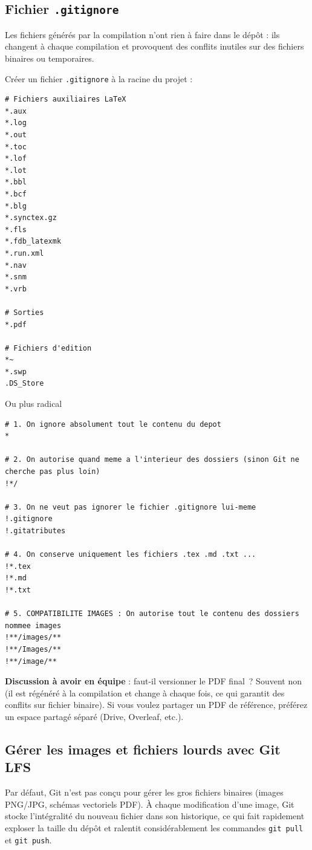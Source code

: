 \documentclass[11pt,a4paper]{article}
\begin{document}
\subsection{Fichier \texttt{.gitignore}}

Les fichiers générés par la compilation n'ont rien à faire dans le dépôt : ils changent à chaque compilation et provoquent des conflits inutiles sur des fichiers binaires ou temporaires.

Créer un fichier \texttt{.gitignore} à la racine du projet :

\begin{lstlisting}[style=plainstyle]
# Fichiers auxiliaires LaTeX
*.aux
*.log
*.out
*.toc
*.lof
*.lot
*.bbl
*.bcf
*.blg
*.synctex.gz
*.fls
*.fdb_latexmk
*.run.xml
*.nav
*.snm
*.vrb

# Sorties
*.pdf

# Fichiers d'edition
*~
*.swp
.DS_Store
\end{lstlisting}

Ou plus radical 
\begin{lstlisting}[style=plainstyle]
# 1. On ignore absolument tout le contenu du depot
*

# 2. On autorise quand meme a l'interieur des dossiers (sinon Git ne cherche pas plus loin)
!*/

# 3. On ne veut pas ignorer le fichier .gitignore lui-meme
!.gitignore
!.gitatributes

# 4. On conserve uniquement les fichiers .tex .md .txt ...
!*.tex
!*.md
!*.txt

# 5. COMPATIBILITE IMAGES : On autorise tout le contenu des dossiers nommee images
!**/images/**
!**/Images/**
!**/image/**
\end{lstlisting}


\textbf{Discussion à avoir en équipe} : faut-il versionner le PDF final~? Souvent non (il est régénéré à la compilation et change à chaque fois, ce qui garantit des conflits sur fichier binaire). Si vous voulez partager un PDF de référence, préférez un espace partagé séparé (Drive, Overleaf, etc.).

\subsection{Gérer les images et fichiers lourds avec Git LFS}

Par défaut, Git n'est pas conçu pour gérer les gros fichiers binaires (images PNG/JPG, schémas vectoriels PDF). À chaque modification d'une image, Git stocke l'intégralité du nouveau fichier dans son historique, ce qui fait rapidement exploser la taille du dépôt et ralentit considérablement les commandes \texttt{git pull} et \texttt{git push}.
\end{document}
